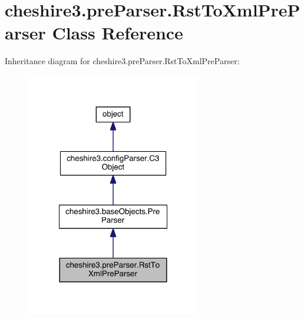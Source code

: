 \hypertarget{classcheshire3_1_1pre_parser_1_1_rst_to_xml_pre_parser}{\section{cheshire3.\-pre\-Parser.\-Rst\-To\-Xml\-Pre\-Parser Class Reference}
\label{classcheshire3_1_1pre_parser_1_1_rst_to_xml_pre_parser}
}


Inheritance diagram for cheshire3.\-pre\-Parser.\-Rst\-To\-Xml\-Pre\-Parser\-:
\nopagebreak
\begin{figure}[H]
\begin{center}
\leavevmode
\includegraphics[width=216pt]{classcheshire3_1_1pre_parser_1_1_rst_to_xml_pre_parser__inherit__graph}
\end{center}
\end{figure}



